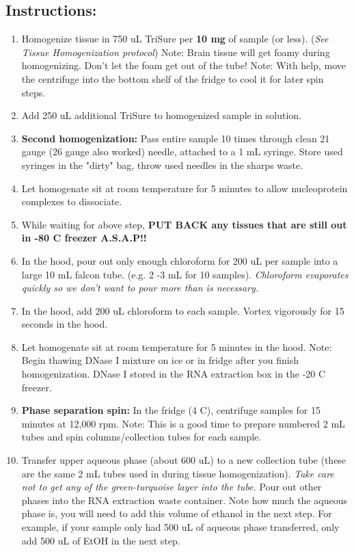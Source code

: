 \documentclass[a4paper,12pt,twoside]{book}
\begin{document}
 \subsection*{Instructions:}
\begin{enumerate}
	\item Homogenize tissue in 750 uL TriSure per {\bf 10 mg} of sample (or less). ({\em See Tissue Homogenization protocol}) 
	\subitem Note: Brain tissue will get foamy during homogenizing. Don't let the foam get out of the tube! 
	\subitem Note: With help, move the centrifuge into the bottom shelf of the fridge to cool it for later spin steps. 
	\item Add 250 uL additional TriSure to homogenized sample in solution. 
	\item {\bf Second homogenization:} Pass entire sample 10 times through clean 21 gauge (26 gauge also worked) needle, attached to a 1 mL syringe. Store used syringes in the "dirty" bag, throw used needles in the sharps waste. 
	\item Let homogenate sit at room temperature for 5 minutes to allow nucleoprotein complexes to dissociate. 
	\item While waiting for above step, {\bf PUT BACK any tissues that are still out in -80 C freezer A.S.A.P!!}
	\item In the hood, pour out only enough chloroform for 200 uL per sample into a large 10 mL falcon tube. (e.g. 2 -3 mL for 10 samples). {\em Chloroform evaporates quickly so we don't want to pour more than is necessary.}
	\item  In the hood, add 200 uL chloroform to each sample. Vortex vigorously for 15 seconds in the hood. 
	\item Let homogenate sit at room temperature for 5 minutes in the hood. 
	\subitem Note: Begin thawing DNase I mixture on ice or in fridge after you finish homogenization. DNase I stored in the RNA extraction box in the -20 C freezer. 
	\item {\bf Phase separation spin:}  In the fridge (4 C), centrifuge samples for 15 minutes at 12,000 rpm. 
	\subitem Note: This is a good time to prepare numbered 2 mL tubes and spin columns/collection tubes for each sample.
	\item  Transfer upper aqueous phase (about 600 uL) to a new collection tube (these are the same 2 mL tubes used in during tissue homogenization). {\em Take care not to get any of the green-turquoise layer into the  tube.}  Pour out other phases into the RNA extraction waste container. 
	\subitem Note how much the aqueous phase is, you will need to add this volume of ethanol in the next step. For example, if your sample only had 500 uL of aqueous phase transferred, only add 500 uL of EtOH in the next step. 

\end{enumerate}
\end{document}
